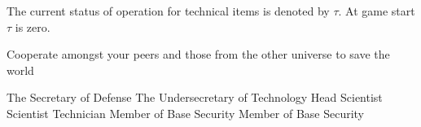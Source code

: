\documentclass[blue]{guildcamp3}
\begin{document}
The current status of operation for technical items is denoted by $\tau$. At game start $\tau$ is zero. 

\begin{itemz}[Goals]
	\item Cooperate amongst your peers and those from the other universe to save the world
\end{itemz}


\begin{members}
	\member{\cPoliOne{}} The Secretary of Defense
	\member{\cPoliTwo{}} The Undersecretary of Technology
	\member{\cSciOne{}} Head Scientist
	\member{\cSciTwo{}} Scientist
	\member{\cTech{}} Technician
	\member{\cSpecOpOne{}} Member of Base Security
	\member{\cSpecOpTwo{}} Member of Base Security
\end{members}
\end{document}
